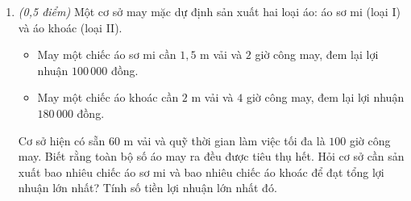 \documentclass[12pt,a4paper]{article}
\newcommand{\parttitle}[1]{\par\vspace{2pt}{\large\bfseries\color{ink}#1}\par\vspace{1pt}}
\begin{document}
\begin{enumerate}[resume]
\begin{center}
\end{center}

\begin{enumerate}
    \item Tính độ dài khoảng cách $AC$ từ vị trí quan sát $A$ đến đỉnh hải đăng $C$.
    \item Tính chiều cao $CD$ của ngọn hải đăng (kết quả làm tròn đến hàng phần mười).
\end{enumerate}

\item \textit{(0,5 điểm)} Một cơ sở may mặc dự định sản xuất hai loại áo: áo sơ mi (loại I) và áo khoác (loại II).
\begin{itemize}[leftmargin=0.5cm]
    \item May một chiếc áo sơ mi cần $1,5\text{ m}$ vải và $2$ giờ công may, đem lại lợi nhuận $100\,000$ đồng.
    \item May một chiếc áo khoác cần $2\text{ m}$ vải và $4$ giờ công may, đem lại lợi nhuận $180\,000$ đồng.
\end{itemize}
Cơ sở hiện có sẵn $60\text{ m}$ vải và quỹ thời gian làm việc tối đa là $100$ giờ công may. Biết rằng toàn bộ số áo may ra đều được tiêu thụ hết. Hỏi cơ sở cần sản xuất bao nhiêu chiếc áo sơ mi và bao nhiêu chiếc áo khoác để đạt tổng lợi nhuận lớn nhất? Tính số tiền lợi nhuận lớn nhất đó.
\end{enumerate}

\newpage
\parttitle{BẢNG ĐÁP ÁN TỔNG HỢP}
\end{document}
